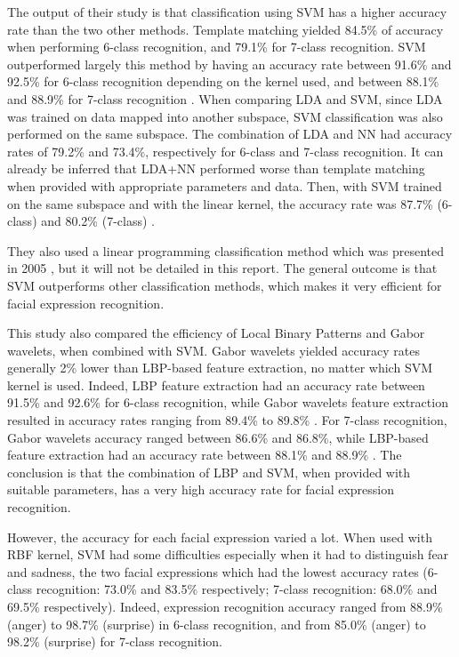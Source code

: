 \noindent The output of their study is that classification using SVM has a higher accuracy rate than the two other methods. Template matching yielded 84.5\% of accuracy when performing 6-class recognition, and 79.1\% for 7-class recognition. SVM outperformed largely this method by having an accuracy rate between 91.6\% and 92.5\% for 6-class recognition depending on the kernel used, and between 88.1\% and 88.9\% for 7-class recognition \cite{SHA09}. When comparing LDA and SVM, since LDA was trained on data mapped into another subspace, SVM classification was also performed on the same subspace. The combination of LDA and NN had accuracy rates of 79.2\% and 73.4\%, respectively for 6-class and 7-class recognition. It can already be inferred that LDA+NN performed worse than template matching when provided with appropriate parameters and data. Then, with SVM trained on the same subspace and with the linear kernel, the accuracy rate was 87.7\% (6-class) and 80.2\% (7-class) \cite{SHA09}.
\newline

\noindent They also used a linear programming classification method which was presented in 2005 \cite{FEN05}, but it will not be detailed in this report. The general outcome is that SVM outperforms other classification methods, which makes it very efficient for facial expression recognition.
\newline

\noindent This study also compared the efficiency of Local Binary Patterns and Gabor wavelets, when combined with SVM. Gabor wavelets yielded accuracy rates generally 2\% lower than LBP-based feature extraction, no matter which SVM kernel is used. Indeed, LBP feature extraction had an accuracy rate between 91.5\% and 92.6\% for 6-class recognition, while Gabor wavelets feature extraction resulted in accuracy rates ranging from 89.4\% to 89.8\% \cite{SHA09}. For 7-class recognition, Gabor wavelets accuracy ranged between 86.6\% and 86.8\%, while LBP-based feature extraction had an accuracy rate between 88.1\% and 88.9\% \cite{SHA09}. The conclusion is that the combination of LBP and SVM, when provided with suitable parameters, has a very high accuracy rate for facial expression recognition.
\newline

\noindent However, the accuracy for each facial expression varied a lot. When used with RBF kernel, SVM had some difficulties especially when it had to distinguish fear and sadness, the two facial expressions which had the lowest accuracy rates (6-class recognition: 73.0\% and 83.5\% respectively; 7-class recognition: 68.0\% and 69.5\% respectively). Indeed, expression recognition accuracy ranged from 88.9\% (anger) to 98.7\% (surprise) in 6-class recognition, and from 85.0\% (anger) to 98.2\% (surprise) for 7-class recognition.
\newline


